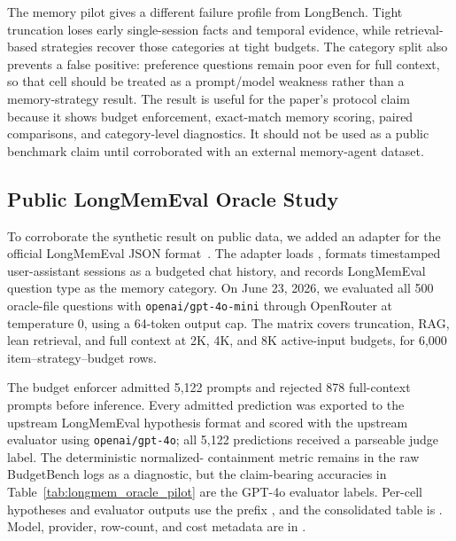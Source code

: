 \documentclass[11pt]{article}
\begin{document}
The memory pilot gives a different failure profile from LongBench.  Tight
truncation loses early single-session facts and temporal evidence, while
retrieval-based strategies recover those categories at tight budgets.  The
category split also prevents a false positive: preference questions remain
poor even for full context, so that cell should be treated as a prompt/model
weakness rather than a memory-strategy result.  The result is useful for the
paper's protocol claim because it shows budget enforcement, exact-match
memory scoring, paired comparisons, and category-level diagnostics.  It should
not be used as a public benchmark claim until corroborated with an external
memory-agent dataset.

\subsection{Public LongMemEval Oracle Study}

To corroborate the synthetic result on public data, we added an adapter for
the official LongMemEval JSON format~\citep{wu2024longmemeval}.  The adapter
loads , formats timestamped user-assistant
sessions as a budgeted chat history, and records LongMemEval question type as
the memory category.  On June 23, 2026, we evaluated all 500 oracle-file
questions with \texttt{openai/gpt-4o-mini} through OpenRouter at temperature
0, using a 64-token output cap.  The matrix covers truncation, RAG, lean
retrieval, and full context at 2K, 4K, and 8K active-input budgets, for 6,000
item--strategy--budget rows.

The budget enforcer admitted 5,122 prompts and rejected 878 full-context
prompts before inference.  Every admitted prediction was exported to the
upstream LongMemEval hypothesis format and scored with the upstream
 evaluator using \texttt{openai/gpt-4o}; all 5,122
predictions received a parseable judge label.  The deterministic normalized-
containment metric remains in the raw BudgetBench logs as a diagnostic, but
the claim-bearing accuracies in Table~\ref{tab:longmem_oracle_pilot} are the
GPT-4o evaluator labels.  Per-cell hypotheses and evaluator outputs use the
prefix , and the consolidated
table is .
Model, provider, row-count, and cost metadata are in
.
\end{document}
